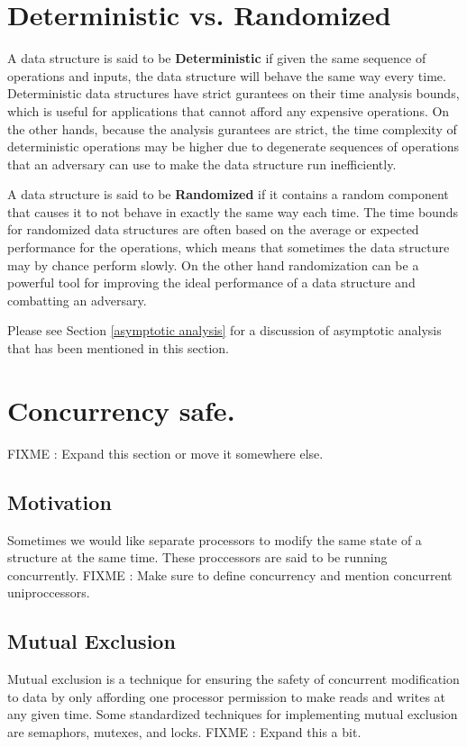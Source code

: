 \documentclass[12pt, letterpaper]{book}
\begin{document}
\section{Deterministic vs. Randomized}

A data structure is said to be \textbf{Deterministic} if given the same sequence of operations and inputs, the data structure will behave the same way every time. Deterministic data structures have strict gurantees on their time analysis bounds, which is useful for applications that cannot afford any expensive operations. On the other hands, because the analysis gurantees are strict, the time complexity of deterministic operations may be higher due to degenerate sequences of operations that an adversary can use to make the data structure run inefficiently.

A data structure is said to be \textbf{Randomized} if it contains a random component that causes it to not behave in exactly the same way each time. The time bounds for randomized data structures are often based on the average or expected performance for the operations, which means that sometimes the data structure may by chance perform slowly. On the other hand randomization can be a powerful tool for improving the ideal performance of a data structure and combatting an adversary.

Please see Section \ref{asymptotic analysis} for a discussion of asymptotic analysis that has been mentioned in this section.

\section{Concurrency safe.}
	FIXME : Expand this section or move it somewhere else.
	\subsection{Motivation}
	Sometimes we would like separate processors to modify the same state of a structure at the same time. These proccessors are said to be running concurrently. FIXME : Make sure to define concurrency and mention concurrent uniproccessors.
	\subsection{Mutual Exclusion}
Mutual exclusion is a technique for ensuring the safety of concurrent modification to data by only affording one processor permission to make reads and writes at any given time. Some standardized techniques for implementing mutual exclusion are semaphors, mutexes, and locks. FIXME : Expand this a bit.
\end{document}
